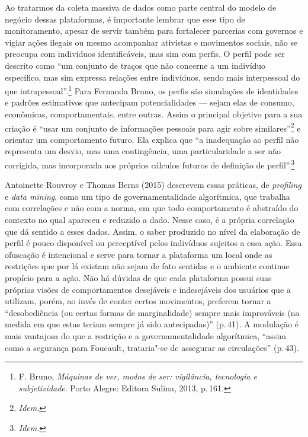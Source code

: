 Ao tratarmos da coleta massiva de dados como parte central do modelo de
negócio dessas plataformas, é importante lembrar que esse tipo de
monitoramento, apesar de servir também para fortalecer parcerias com
governos e vigiar ações ilegais ou mesmo acompanhar ativistas e
movimentos sociais, não se preocupa com indivíduos identificáveis, mas
sim com perfis. O perfil pode ser descrito como ``um conjunto de traços
que não concerne a um indivíduo específico, mas sim expressa relações
entre indivíduos, sendo mais interpessoal do que intrapessoal''.\footnote{F. Bruno, \textit{Máquinas de ver, modos de ser: vigilância, tecnologia e subjetividade}. Porto Alegre: Editora Sulina, 2013, p.\,161.} Para Fernanda Bruno, os perfis são simulações de identidades e
padrões estimativos que antecipam potencialidades ­--- sejam elas de
consumo, econômicas, comportamentais, entre outras. Assim o principal
objetivo para a sua criação é ``usar um conjunto de informações pessoais
para agir sobre similares''\footnote{\textit{Idem}.} e orientar um comportamento futuro.
Ela explica que ``a inadequação ao perfil não representa um desvio, mas
uma contingência, uma particularidade a ser não corrigida, mas
incorporada aos próprios cálculos futuros de definição de
perfil''.\footnote{\textit{Idem}.}

Antoinette Rouvroy e Thomas Berns (2015) descrevem essas práticas, 
de \textit{profiling} e \textit{data mining}, como um tipo de
governamentalidade algorítmica, que trabalha com correlações e não com a
norma, em que todo comportamento é abstraído do contexto no qual
apareceu e reduzido a dado. Nesse caso, é a própria correlação que dá
sentido a esses dados. Assim, o saber produzido no nível da elaboração
de perfil é pouco disponível ou perceptível pelos indivíduos sujeitos a
essa ação. Essa ofuscação é intencional e serve para tornar a plataforma
um local onde as restrições que por lá existam não sejam de fato
sentidas e o ambiente continue propício para a ação. Não há dúvidas de
que cada plataforma possui suas próprias visões de comportamentos
desejáveis e indesejáveis dos usuários que a utilizam, porém, ao invés
de conter certos movimentos, preferem tornar a ``desobediência (ou
certas formas de marginalidade) sempre mais improváveis (na medida em
que estas teriam sempre já sido antecipadas)'' (p.\,41). A modulação é mais
vantajosa do que a restrição e a governamentalidade algorítmica, ``assim
como a segurança para Foucault, trataria"-se de assegurar as
circulações'' (p.\,43).

